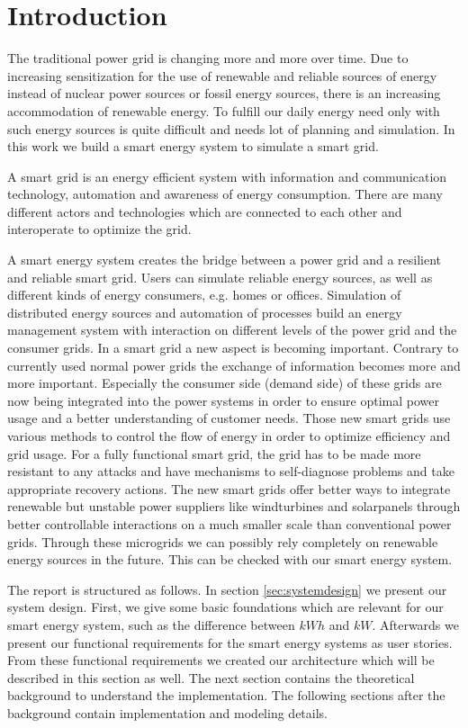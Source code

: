 \section{Introduction}

The traditional power grid is changing more and more over time.
Due to increasing sensitization for the use of renewable and reliable sources of energy instead of nuclear power sources or fossil energy sources, there is an increasing accommodation of renewable energy.
To fulfill our daily energy need only with such energy sources is quite difficult and needs lot of planning and simulation.
In this work we build a smart energy system to simulate a smart grid.

A smart grid is an energy efficient system with information and communication technology, automation and awareness of energy consumption.
There are many different actors and technologies which are connected to each other and interoperate to optimize the grid.

A smart energy system creates the bridge between a power grid and a resilient and reliable smart grid.
Users can simulate reliable energy sources, as well as different kinds of energy consumers, e.g. homes or offices.
Simulation of distributed energy sources and automation of processes build an energy management system with interaction on different levels of the power grid and the consumer grids.
In a smart grid a new aspect is becoming important.
Contrary to currently used normal power grids the exchange of information becomes more and more important.
Especially the consumer side (demand side) of these grids are now being integrated into the power systems in order to ensure optimal power usage and a better understanding of customer needs.
Those new smart grids use various methods to control the flow of energy in order to optimize efficiency and grid usage.
For a fully functional smart grid, the grid has to be made more resistant to any attacks and have mechanisms to self-diagnose problems and take appropriate recovery actions.
The new smart grids offer better ways to integrate renewable but unstable power suppliers like  windturbines and solarpanels through better controllable interactions on a much smaller scale than conventional power grids. 
Through these microgrids we can possibly rely completely on renewable energy sources in the future.
This can be checked with our smart energy system.

The report is structured as follows.
In section \ref{sec:systemdesign} we present our system design.
First, we give some basic foundations which are relevant for our smart energy system, such as the difference between $kWh$ and $kW$.
Afterwards we present our functional requirements for the smart energy systems as user stories.
From these functional requirements we created our architecture which will be described in this section as well. The next section contains the theoretical background to understand the implementation. The following sections after the background contain implementation and modeling details.

